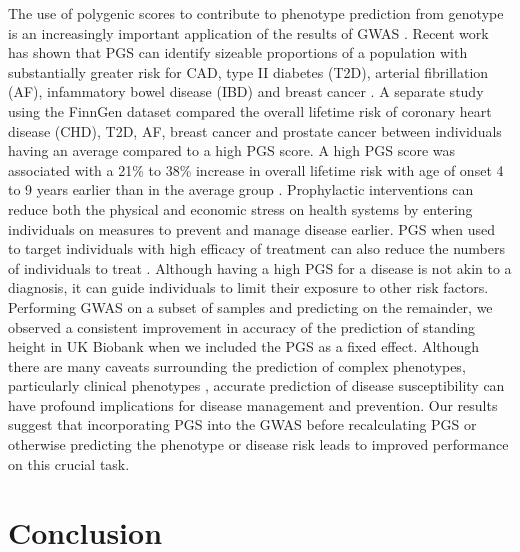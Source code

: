 \documentclass[fleqn,10pt]{wlscirep}
\begin{document}

The use of polygenic scores to contribute to phenotype prediction from genotype is an increasingly important application of the results of GWAS \cite{martin2019predicting}. Recent work has shown that PGS can identify sizeable proportions of a population with substantially greater risk for CAD, type II diabetes (T2D), arterial fibrillation (AF), infammatory bowel disease (IBD) and breast cancer \cite{khera2018genome}. A separate study using the FinnGen dataset compared the overall lifetime risk of coronary heart disease (CHD), T2D, AF, breast cancer and prostate cancer between individuals having an average compared to a high PGS score. A high PGS score was associated with a 21\% to 38\% increase in overall lifetime risk with age of onset 4 to 9 years earlier than in the average group \cite{mars2020polygenic}. Prophylactic interventions can reduce both the physical and economic stress on health systems by entering individuals on measures to prevent and manage disease earlier. PGS when used to target individuals with high efficacy of treatment can also reduce the numbers of individuals to treat \cite{gibson2019utilization}. Although having a high PGS for a disease is not akin to a diagnosis, it can guide individuals to limit their exposure to other risk factors. Performing GWAS on a subset of samples and predicting on the remainder, we observed a consistent improvement in accuracy of the prediction of standing height in UK Biobank when we included the PGS as a fixed effect. Although there are many caveats surrounding the prediction of complex phenotypes, particularly clinical phenotypes \cite{duncan2019analysis}, accurate prediction of disease susceptibility can have profound implications for disease management and prevention. Our results suggest that incorporating PGS into the GWAS before recalculating PGS or otherwise predicting the phenotype or disease risk leads to improved performance on this crucial task.



\section*{Conclusion}
\end{document}

